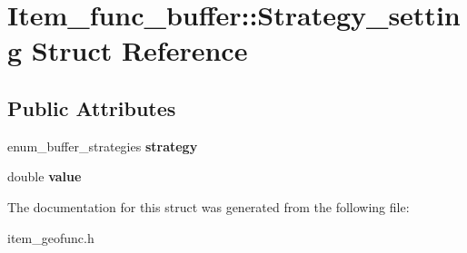 \hypertarget{structItem__func__buffer_1_1Strategy__setting}{}\section{Item\+\_\+func\+\_\+buffer\+:\+:Strategy\+\_\+setting Struct Reference}
\label{structItem__func__buffer_1_1Strategy__setting}
\subsection*{Public Attributes}
\begin{DoxyCompactItemize}
\item 
\mbox{\label{structItem__func__buffer_1_1Strategy__setting_a096aaf3f93501f0dcf951cdf4898104e}} 
enum\+\_\+buffer\+\_\+strategies {\bfseries strategy}
\item 
\mbox{\label{structItem__func__buffer_1_1Strategy__setting_a90dc5e5face94ad05b4c3a35cd84ad30}} 
double {\bfseries value}
\end{DoxyCompactItemize}


The documentation for this struct was generated from the following file\+:\begin{DoxyCompactItemize}
\item 
item\+\_\+geofunc.\+h\end{DoxyCompactItemize}

